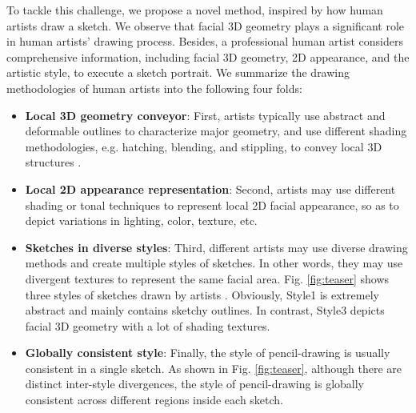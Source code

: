 \documentclass[10pt,twocolumn,letterpaper]{article}
\begin{document}
To tackle this challenge, we propose a novel method, inspired by how human artists draw a sketch. We observe that facial 3D geometry plays a significant role in human artists' drawing process. Besides, a professional human artist considers comprehensive information, including facial 3D geometry, 2D appearance, and the artistic style, to execute a sketch portrait.  
We summarize the drawing methodologies of human artists \cite{li2019im2pencil} into the following four folds:
\begin{itemize}
	\item \textbf{Local 3D geometry conveyor}: First, artists typically use abstract and deformable outlines to characterize major geometry, and use different shading methodologies, e.g. hatching, blending, and stippling, to convey local 3D structures \cite{chan2022informativedraw}. 
	\item \textbf{Local 2D appearance representation}: Second, artists may use different shading or tonal techniques to represent local 2D facial appearance, so as to depict variations in lighting, color, texture, etc.
	\item \textbf{Sketches in diverse styles}: Third, different artists may use diverse drawing methods and create multiple styles of sketches. In other words, they may use divergent textures to represent the same facial area. Fig. \ref{fig:teaser} shows three styles of sketches drawn by artists \cite{Fan2021FS2K}. Obviously, Style1 is extremely abstract and mainly contains sketchy outlines. In contrast, Style3 depicts facial 3D geometry with a lot of shading textures.
	\item \textbf{Globally consistent style}: Finally, the style of pencil-drawing is usually consistent in a single sketch. As shown in Fig. \ref{fig:teaser}, although there are distinct inter-style divergences, the style of pencil-drawing is globally consistent across different regions inside each sketch.
\end{itemize}

\end{document}
